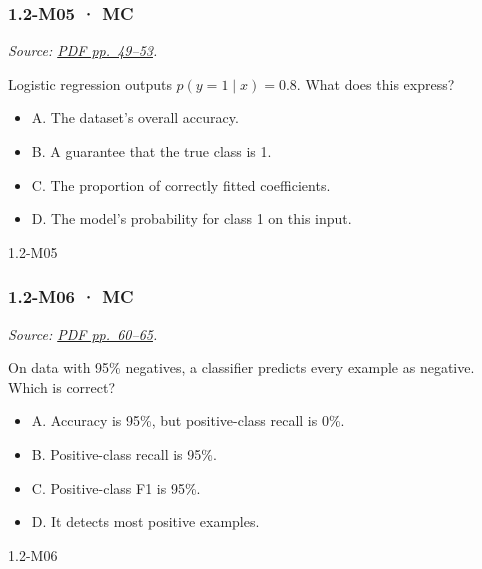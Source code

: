 \noindent\begin{minipage}{\linewidth}

\subsubsection{1.2-M05 · MC}\label{m05-mc-1}

\emph{Source:
\href{../Lecture\%20Slides/1.2.\%20Shallow\%20Learning.pdf\#page=49}{PDF
pp.~49--53}.}

Logistic regression outputs \(p(y=1\mid x)=0.8\). What does this
express?

\begin{itemize}
\tightlist
\item
  A. The dataset's overall accuracy.
\item
  B. A guarantee that the true class is 1.
\item
  C. The proportion of correctly fitted coefficients.
\item
  D. The model's probability for class 1 on this input.
\end{itemize}

\begin{solution}[8mm]{1.2-M05}

\end{solution}
\end{minipage}\par\medskip

\noindent\begin{minipage}{\linewidth}

\subsubsection{1.2-M06 · MC}\label{m06-mc-1}

\emph{Source:
\href{../Lecture\%20Slides/1.2.\%20Shallow\%20Learning.pdf\#page=60}{PDF
pp.~60--65}.}

On data with 95\% negatives, a classifier predicts every example as
negative. Which is correct?

\begin{itemize}
\tightlist
\item
  A. Accuracy is 95\%, but positive-class recall is 0\%.
\item
  B. Positive-class recall is 95\%.
\item
  C. Positive-class F1 is 95\%.
\item
  D. It detects most positive examples.
\end{itemize}

\begin{solution}[8mm]{1.2-M06}

\end{solution}
\end{minipage}\par\medskip

